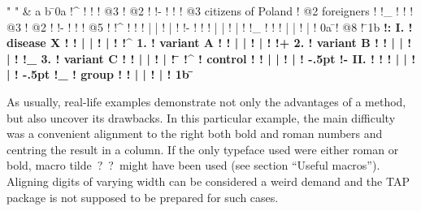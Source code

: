 \medskip
\medskip
\thistable{\desiredwidth\hsize \longcalculationfalse}
\beginanchtable
\begintableformat
  \right " \left " &\center
\endtableformat
%
a
b
%
\=
\uranchor0a
\B!^        !           !        !   @3                      !  @2              \E!
\B!-        !           !        !   @3 citizens of Poland   !  @2 foreigners   \E!
\B!_        !           !        !   @3                      !  @2              \E!
\B!- 
     !   !  
                                  !                          @5  \-             \E!
\B!^        !           !         !         |        |       !        |         \E!
\B!-        !           !         !
                                  |
                                  |
                                  !
                                  | \E!
\B!_        !           !         !         |        |        !        |        \E!
\llanchor0a
\=
\B!  @8 \vrule width 0mm height 0.75mm \E!
\=
\uranchor1b
\F\bf
\B!:  I.    ! disease X !  !  |  |  !  |  \E!
\F\rm
\-
\B!^  1.    ! variant A !  !  |  |  !  |  \E!
\B!+  2.    ! variant B !  !  |  |  !  |  \E!
\B!_  3.    ! variant C !  !  |  |  !  |  \E!
\=
\F\bf
\B!^        ! control   !         !         |        |        !        |        \E!
\K-.5pt %
\B!- II.    !           !  !  |  |  !  |  \E!
\K-.5pt %
\B!_        ! group     !         !         |        |        !        |        \E!
\llanchor1b
\=
\endanchtable
\medskip
\medskip

As usually, real-life examples demonstrate not only the advantages of a
method, but also uncover its drawbacks. In this particular example, the main
difficulty was a convenient alignment to the right both bold and roman
numbers and centring the result in a column. If the only typeface used were
either roman or bold, macro tilde~?~?~might have been used (see section
``Useful macros'').  Aligning digits of varying width can be considered a
weird demand and the TAP package is not supposed to be prepared for such
cases.

